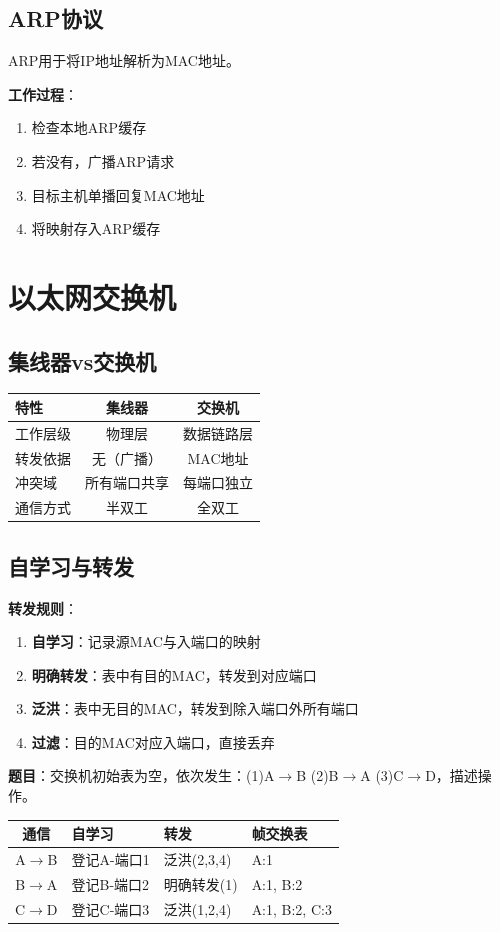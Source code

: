 \subsection{ARP协议}
ARP用于将IP地址解析为MAC地址。

\textbf{工作过程}：
\begin{enumerate}[leftmargin=2em,itemsep=0pt]
    \item 检查本地ARP缓存
    \item 若没有，广播ARP请求
    \item 目标主机单播回复MAC地址
    \item 将映射存入ARP缓存
\end{enumerate}

\section{以太网交换机}
\subsection{集线器vs交换机}
\begin{table}[htbp]
\centering\small
\begin{tabular}{lcc}
\toprule
\textbf{特性} & \textbf{集线器} & \textbf{交换机} \\
\midrule
工作层级 & 物理层 & 数据链路层 \\
转发依据 & 无（广播） & MAC地址 \\
冲突域 & 所有端口共享 & 每端口独立 \\
通信方式 & 半双工 & 全双工 \\
\bottomrule
\end{tabular}
\end{table}

\subsection{自学习与转发}
\textbf{转发规则}：
\begin{enumerate}[leftmargin=2em,itemsep=0pt]
    \item \textbf{自学习}：记录源MAC与入端口的映射
    \item \textbf{明确转发}：表中有目的MAC，转发到对应端口
    \item \textbf{泛洪}：表中无目的MAC，转发到除入端口外所有端口
    \item \textbf{过滤}：目的MAC对应入端口，直接丢弃
\end{enumerate}

\begin{examplebox}[例题3.5 交换机转发]
\textbf{题目}：交换机初始表为空，依次发生：(1)A$\to$B (2)B$\to$A (3)C$\to$D，描述操作。
\tcblower
\begin{tabular}{|c|l|l|l|}
\hline
\textbf{通信} & \textbf{自学习} & \textbf{转发} & \textbf{帧交换表} \\
\hline
A$\to$B & 登记A-端口1 & 泛洪(2,3,4) & A:1 \\
B$\to$A & 登记B-端口2 & 明确转发(1) & A:1, B:2 \\
C$\to$D & 登记C-端口3 & 泛洪(1,2,4) & A:1, B:2, C:3 \\
\hline
\end{tabular}
\end{examplebox}


